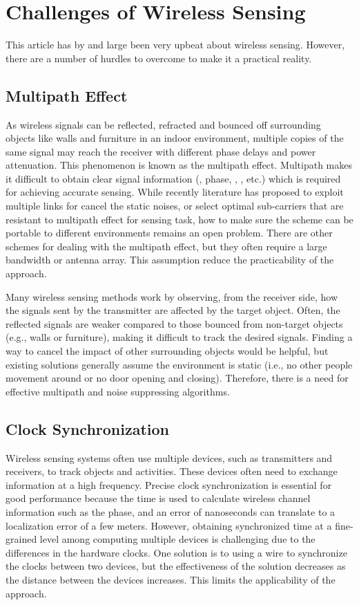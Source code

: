 \section{Challenges of Wireless Sensing}
This article has by and large been very upbeat about wireless sensing. However, there are a number of hurdles to overcome to make it a
practical reality.

\subsection{Multipath Effect}

As wireless signals can be reflected, refracted and bounced off surrounding objects like walls and furniture in an indoor environment,
multiple copies of the same signal may reach the receiver with different phase delays and power attenuation. This phenomenon is known as
the multipath effect. Multipath makes it difficult to obtain clear signal information (\RSSI, phase, \AoA, \TOF, etc.) which is required
for achieving accurate sensing. While recently literature has proposed to exploit multiple links for cancel the static noises, or select
optimal sub-carriers that are resistant to multipath effect for sensing task, how to make sure the scheme can be portable to different
environments remains an open problem. There are other schemes for dealing with the multipath effect, but they often require a large
bandwidth or antenna array. This assumption reduce the practicability of the approach.


Many wireless sensing methods work by observing, from the receiver side, how the signals sent by the transmitter are affected by the target
object. Often, the reflected signals are weaker compared to those bounced from non-target objects (e.g., walls or furniture), making it
difficult to track the desired signals. Finding a way to cancel the impact of other surrounding objects would be helpful, but existing
solutions generally assume the environment is static (i.e., no other people movement around or no door opening and closing). Therefore,
there is a need for effective multipath and noise suppressing algorithms.


\subsection{Clock Synchronization} Wireless sensing systems often use multiple devices, such as transmitters and receivers, to track
objects and activities. These devices often need to exchange information at a high frequency. Precise clock synchronization is essential
for good performance because the time is used to calculate wireless channel information such as the phase, and an error of nanoseconds can
translate to a localization error of a few meters. However, obtaining synchronized time at a fine-grained level among computing multiple
devices is challenging due to the differences in the hardware clocks. One solution is to using a wire to synchronize the clocks between two
devices, but the effectiveness of the solution decreases as the distance between the devices increases. This limits the applicability of
the approach.

